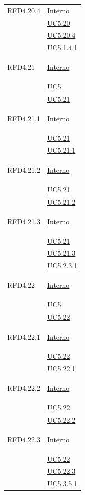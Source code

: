 \begin{longtable}{|>{\centering}m{5cm}|m{5cm}<{\centering}|}
\hypertarget{RFD4.20.4}{RFD4.20.4} & \hyperlink{Interno}{Interno}\\
&\hyperref[UC5.20]{UC5.20}\\
&\hyperref[UC5.20.4]{UC5.20.4}\\ 
&\hyperref[UC5.1.4.1]{UC5.1.4.1}\\ \hline

\hypertarget{RFD4.21}{RFD4.21} & \hyperlink{Interno}{Interno}\\
&\hyperref[UC5]{UC5}\\
&\hyperref[UC5.21]{UC5.21}\\ \hline

\hypertarget{RFD4.21.1}{RFD4.21.1} & \hyperlink{Interno}{Interno}\\
&\hyperref[UC5.21]{UC5.21}\\
&\hyperref[UC5.21.1]{UC5.21.1}\\ \hline

\hypertarget{RFD4.21.2}{RFD4.21.2} & \hyperlink{Interno}{Interno}\\
&\hyperref[UC5.21]{UC5.21}\\
&\hyperref[UC5.21.2]{UC5.21.2}\\ \hline

\hypertarget{RFD4.21.3}{RFD4.21.3} & \hyperlink{Interno}{Interno}\\
&\hyperref[UC5.21]{UC5.21}\\
&\hyperref[UC5.21.3]{UC5.21.3}\\
&\hyperref[UC5.2.3.1]{UC5.2.3.1}\\ \hline

\hypertarget{RFD4.22}{RFD4.22} & \hyperlink{Interno}{Interno}\\
&\hyperref[UC5]{UC5}\\
&\hyperref[UC5.22]{UC5.22}\\ \hline

\hypertarget{RFD4.22.1}{RFD4.22.1} &   \hyperlink{Interno}{Interno}\\
&\hyperref[UC5.22]{UC5.22}\\
&\hyperref[UC5.22.1]{UC5.22.1}\\ \hline

\hypertarget{RFD4.22.2}{RFD4.22.2} & \hyperlink{Interno}{Interno}\\
&\hyperref[UC5.22]{UC5.22}\\
&\hyperref[UC5.22.2]{UC5.22.2}\\ \hline

\hypertarget{RFD4.22.3}{RFD4.22.3} &\hyperlink{Interno}{Interno}\\
&\hyperref[UC5.22]{UC5.22}\\
&\hyperref[UC5.22.3]{UC5.22.3}\\
&\hyperref[UC5.3.5.1]{UC5.3.5.1}\\ \hline


\end{longtable}

